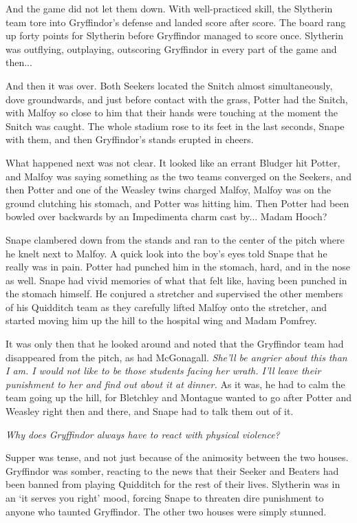 And the game did not let them down. With well-practiced skill, the Slytherin team tore into Gryffindor's defense and landed score after score. The board rang up forty points for Slytherin before Gryffindor managed to score once. Slytherin was outflying, outplaying, outscoring Gryffindor in every part of the game and then...

And then it was over. Both Seekers located the Snitch almost simultaneously, dove groundwards, and just before contact with the grass, Potter had the Snitch, with Malfoy so close to him that their hands were touching at the moment the Snitch was caught. The whole stadium rose to its feet in the last seconds, Snape with them, and then Gryffindor's stands erupted in cheers.

What happened next was not clear. It looked like an errant Bludger hit Potter, and Malfoy was saying something as the two teams converged on the Seekers, and then Potter and one of the Weasley twins charged Malfoy, Malfoy was on the ground clutching his stomach, and Potter was hitting him. Then Potter had been bowled over backwards by an Impedimenta charm cast by... Madam Hooch?

Snape clambered down from the stands and ran to the center of the pitch where he knelt next to Malfoy. A quick look into the boy's eyes told Snape that he really was in pain. Potter had punched him in the stomach, hard, and in the nose as well. Snape had vivid memories of what that felt like, having been punched in the stomach himself. He conjured a stretcher and supervised the other members of his Quidditch team as they carefully lifted Malfoy onto the stretcher, and started moving him up the hill to the hospital wing and Madam Pomfrey.

It was only then that he looked around and noted that the Gryffindor team had disappeared from the pitch, as had McGonagall. \emph{She'll be angrier about this than I am. I would not like to be those students facing her wrath. I'll leave their punishment to her and find out about it at dinner.} As it was, he had to calm the team going up the hill, for Bletchley and Montague wanted to go after Potter and Weasley right then and there, and Snape had to talk them out of it.

\emph{Why does Gryffindor always have to react with physical violence?}

Supper was tense, and not just because of the animosity between the two houses. Gryffindor was somber, reacting to the news that their Seeker and Beaters had been banned from playing Quidditch for the rest of their lives. Slytherin was in an `it serves you right' mood, forcing Snape to threaten dire punishment to anyone who taunted Gryffindor. The other two houses were simply stunned.

